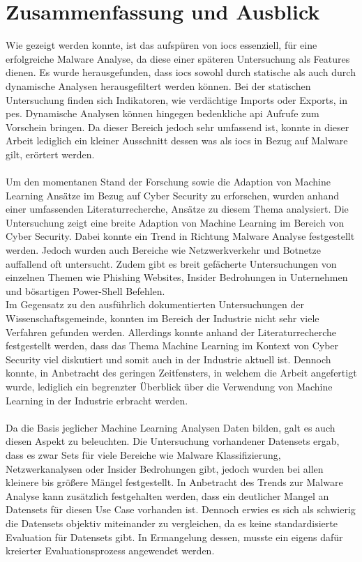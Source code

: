 \documentclass[
    12pt, %
    DIV10,
    ngerman, %
    a4paper, %
    oneside, %
    titlepage, %
    parskip=half, %
    headings=normal, %
    listof=totoc, %
    bibliography=totoc, %
    index=totoc, %
    captions=tableheading, %
    final %
]{scrreprt}
\begin{document}
\chapter{Zusammenfassung und Ausblick}
Wie gezeigt werden konnte, ist das aufspüren von \ac{iocs} essenziell, für eine erfolgreiche Malware Analyse, da diese einer späteren Untersuchung als Features dienen.
Es wurde herausgefunden, dass \ac{iocs} sowohl durch statische als auch durch dynamische Analysen herausgefiltert werden können. Bei der statischen Untersuchung finden sich Indikatoren, wie verdächtige Imports oder Exports, in \ac{pes}. Dynamische Analysen können hingegen bedenkliche \ac{api} Aufrufe zum Vorschein bringen. Da dieser Bereich jedoch sehr umfassend ist, konnte in dieser Arbeit lediglich ein kleiner Ausschnitt dessen was als \ac{iocs} in Bezug auf Malware gilt, erörtert werden.\\\\
Um den momentanen Stand der Forschung sowie die Adaption von Machine Learning Ansätze im Bezug auf Cyber Security zu erforschen, wurden anhand einer umfassenden Literaturrecherche, Ansätze zu diesem Thema analysiert. Die Untersuchung zeigt eine breite Adaption von Machine Learning im Bereich von Cyber Security. Dabei konnte ein Trend in Richtung Malware Analyse festgestellt werden. Jedoch wurden auch Bereiche wie Netzwerkverkehr und Botnetze auffallend oft untersucht. Zudem gibt es breit gefächerte Untersuchungen von einzelnen Themen wie Phishing Websites, Insider Bedrohungen in Unternehmen und bösartigen Power-Shell Befehlen.\\
Im Gegensatz zu den ausführlich dokumentierten Untersuchungen der Wissenschaftsgemeinde, konnten im Bereich der Industrie nicht sehr viele Verfahren gefunden werden. Allerdings konnte anhand der Literaturrecherche festgestellt werden, dass das Thema Machine Learning im Kontext von Cyber Security viel diskutiert und somit auch in der Industrie aktuell ist. Dennoch konnte, in Anbetracht des geringen Zeitfensters, in welchem die Arbeit angefertigt wurde, lediglich ein begrenzter Überblick über die Verwendung von Machine Learning in der Industrie erbracht werden.\\\\
Da die Basis jeglicher Machine Learning Analysen Daten bilden, galt es auch diesen Aspekt zu beleuchten. Die Untersuchung vorhandener Datensets ergab, dass es zwar Sets für viele Bereiche wie Malware Klassifizierung, Netzwerkanalysen oder Insider Bedrohungen gibt, jedoch wurden bei allen kleinere bis grö{\ss}ere Mängel festgestellt. In Anbetracht des Trends zur Malware Analyse kann zusätzlich festgehalten werden, dass ein deutlicher Mangel an Datensets für diesen Use Case vorhanden ist. Dennoch erwies es sich als schwierig die Datensets objektiv miteinander zu vergleichen, da es keine standardisierte Evaluation für Datensets gibt. In Ermangelung dessen, musste ein eigens dafür kreierter Evaluationsprozess angewendet werden.\\\\
\end{document}
